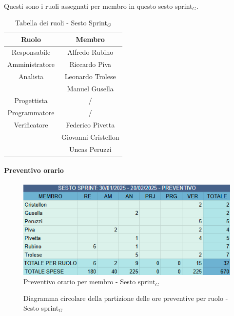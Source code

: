 \documentclass[10pt]{article}
\begin{document}
{{{{{{{    Questi sono i ruoli assegnati per membro in questo sesto sprint$_G$.\\
    \begin{table}[H]
        \centering
        \begin{tabular}{|c|c|}
        \hline
        \rowcolor{gray!25}
        \textbf{Ruolo} & \textbf{Membro}\\
        \hline
        Responsabile & Alfredo Rubino\\
        \hline
        Amministratore & Riccardo Piva \\ 
        \hline
        Analista & Leonardo Trolese \\
        & Manuel Gusella \\
        \hline
        Progettista & / \\
        \hline
        Programmatore & / \\
        \hline
        Verificatore & Federico Pivetta \\
        & Giovanni Cristellon \\
        & Uncas Peruzzi \\
        \hline
        \end{tabular}
        \caption{Tabella dei ruoli - Sesto Sprint$_G$}
    \end{table}

    \paragraph{Preventivo orario}\mbox{}\vspace{0.4em}
    \begin{figure}[H]
    	\centering
    	\includegraphics[width=0.6\linewidth]{preventivoOreSestoSprint.PNG}
    	\caption{Preventivo orario per membro - Sesto sprint$_G$}
    	\label{fig:Preventivo orario per membro - Sesto sprint$_G$}
    \end{figure}

    \begin{figure}[H]
        \centering
        \caption{Diagramma circolare della partizione delle ore preventive per ruolo - Sesto sprint$_G$ }
        \label{fig:Diagramma circolare della partizione delle ore preventive per ruolo - Sesto sprint$_G$}
    \end{figure}
    
}}}}}}}
\end{document}
